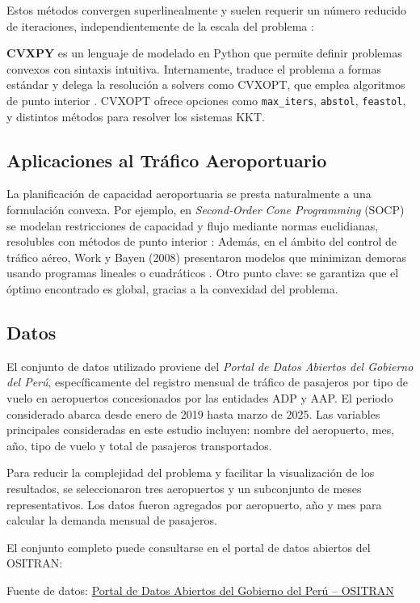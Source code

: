 \documentclass[11pt, a4paper, twocolumn]{article}
\begin{document}
Estos métodos convergen superlinealmente y suelen requerir un número reducido de iteraciones, independientemente de la escala del problema :\citep{cvxpy_solvers}

\textbf{CVXPY} es un lenguaje de modelado en Python que permite definir problemas convexos con sintaxis intuitiva. Internamente, traduce el problema a formas estándar y delega la resolución a solvers como CVXOPT, que emplea algoritmos de punto interior \citep{cvxopt_coneprog}. CVXOPT ofrece opciones como \texttt{max\_iters}, \texttt{abstol}, \texttt{feastol}, y distintos métodos para resolver los sistemas KKT.

\subsection{Aplicaciones al Tráfico Aeroportuario}
La planificación de capacidad aeroportuaria se presta naturalmente a una formulación convexa. Por ejemplo, en \emph{Second‑Order Cone Programming} (SOCP) se modelan restricciones de capacidad y flujo mediante normas euclidianas, resolubles con métodos de punto interior : 
Además, en el ámbito del control de tráfico aéreo, Work y Bayen (2008) presentaron modelos que minimizan demoras usando programas lineales o cuadráticos . Otro punto clave: se garantiza que el óptimo encontrado es global, gracias a la convexidad del problema.

\subsection{Datos}

El conjunto de datos utilizado proviene del \textit{Portal de Datos Abiertos del Gobierno del Perú}, específicamente del registro mensual de tráfico de pasajeros por tipo de vuelo en aeropuertos concesionados por las entidades ADP y AAP. El periodo considerado abarca desde enero de 2019 hasta marzo de 2025. Las variables principales consideradas en este estudio incluyen: nombre del aeropuerto, mes, año, tipo de vuelo y total de pasajeros transportados.

Para reducir la complejidad del problema y facilitar la visualización de los resultados, se seleccionaron tres aeropuertos y un subconjunto de meses representativos. Los datos fueron agregados por aeropuerto, año y mes para calcular la demanda mensual de pasajeros.

El conjunto completo puede consultarse en el portal de datos abiertos del OSITRAN:

\footnotesize
\noindent Fuente de datos: \href{https://datosabiertos.gob.pe/dataset/informacion-trafico-de-pasajeros-por-tipo-de-vuelo-adp-aap-ene-2019-mar-2025-organismo}{Portal de Datos Abiertos del Gobierno del Perú – OSITRAN}
\end{document}
